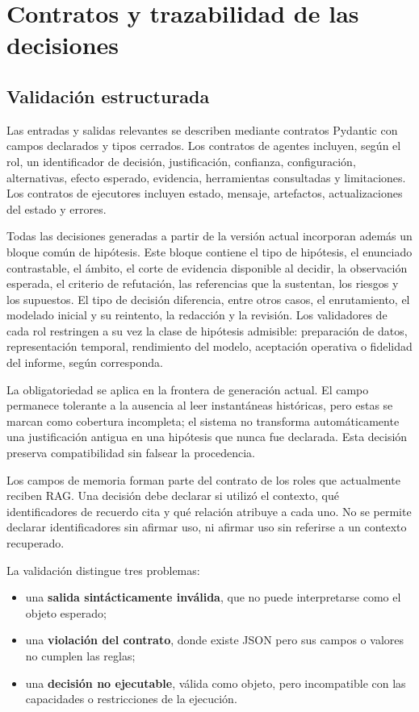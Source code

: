 \section{Contratos y trazabilidad de las decisiones}

\subsection{Validación estructurada}

Las entradas y salidas relevantes se describen mediante contratos Pydantic con
campos declarados y tipos cerrados. Los contratos de agentes incluyen, según el
rol, un identificador de decisión, justificación, confianza, configuración,
alternativas, efecto esperado, evidencia, herramientas consultadas y
limitaciones. Los contratos de ejecutores incluyen estado, mensaje, artefactos,
actualizaciones del estado y errores.

Todas las decisiones generadas a partir de la versión actual incorporan además
un bloque común de hipótesis. Este bloque contiene el tipo de hipótesis, el
enunciado contrastable, el ámbito, el corte de evidencia disponible al decidir,
la observación esperada, el criterio de refutación, las referencias que la
sustentan, los riesgos y los supuestos. El tipo de decisión diferencia, entre
otros casos, el enrutamiento, el modelado inicial y su reintento, la redacción y
la revisión. Los validadores de cada rol restringen a su vez la clase de
hipótesis admisible: preparación de datos, representación temporal, rendimiento
del modelo, aceptación operativa o fidelidad del informe, según corresponda.

La obligatoriedad se aplica en la frontera de generación actual. El campo
permanece tolerante a la ausencia al leer instantáneas históricas, pero estas se
marcan como cobertura incompleta; el sistema no transforma automáticamente una
justificación antigua en una hipótesis que nunca fue declarada. Esta decisión
preserva compatibilidad sin falsear la procedencia.

Los campos de memoria forman parte del contrato de los roles que actualmente
reciben RAG\@. Una decisión debe declarar si utilizó el contexto, qué
identificadores de recuerdo cita y qué relación atribuye a cada uno. No se
permite declarar identificadores sin afirmar uso, ni afirmar uso sin referirse
a un contexto recuperado.

La validación distingue tres problemas:

\begin{itemize}
  \item una \textbf{salida sintácticamente inválida}, que no puede
        interpretarse como el objeto esperado;
  \item una \textbf{violación del contrato}, donde existe JSON pero sus
        campos o valores no cumplen las reglas;
  \item una \textbf{decisión no ejecutable}, válida como objeto, pero
        incompatible con las capacidades o restricciones de la ejecución.
\end{itemize}

